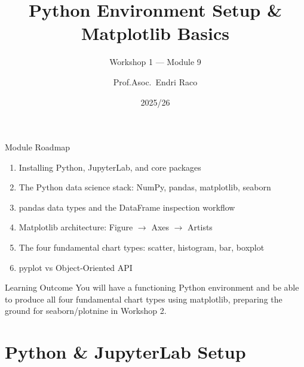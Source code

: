 \documentclass[10pt]{beamer}
\title{Python Environment Setup \& Matplotlib Basics}
\subtitle{Workshop 1 --- Module 9}
\author{Prof.Asoc.\ Endri Raco}
\institute{Data Visualization for Data Scientists \\ UNYT Tirana}
\date{2025/26}
\begin{document}
\begin{frame}
  \titlepage
\end{frame}

\begin{frame}{Module Roadmap}
  \begin{enumerate}
    \item Installing Python, JupyterLab, and core packages
    \item The Python data science stack: NumPy, pandas, matplotlib, seaborn
    \item pandas data types and the DataFrame inspection workflow
    \item Matplotlib architecture: Figure $\rightarrow$ Axes $\rightarrow$ Artists
    \item The four fundamental chart types: scatter, histogram, bar, boxplot
    \item pyplot vs Object-Oriented API
  \end{enumerate}
  \begin{exampleblock}{Learning Outcome}
    You will have a functioning Python environment and be able to produce
    all four fundamental chart types using matplotlib, preparing the
    ground for seaborn/plotnine in Workshop 2.
  \end{exampleblock}
\end{frame}

\section{Python \& JupyterLab Setup}
\end{document}
